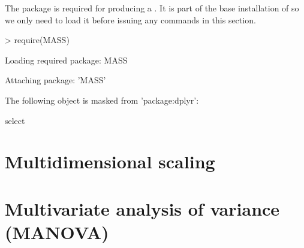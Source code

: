 The  package is required for producing a . It is part of the base installation of \R{} so we only need to load it before issuing any commands in this section.
\begin{Schunk}
\begin{Sinput}
> require(MASS)
\end{Sinput}
\begin{Soutput}
Loading required package: MASS
\end{Soutput}
\begin{Soutput}

Attaching package: 'MASS'
\end{Soutput}
\begin{Soutput}
The following object is masked from 'package:dplyr':

    select
\end{Soutput}
\end{Schunk}

\section{Multidimensional scaling}

\section{Multivariate analysis of variance (MANOVA)}


\section{}


\section{}


\section{}


\section{}


\section{}


\section{}




